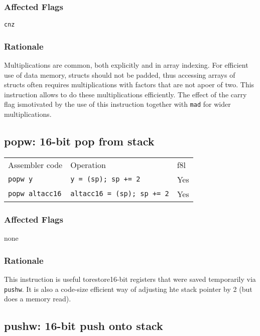 \documentclass{book}
\begin{document}
\subsubsection*{Affected Flags}

\texttt{cnz}

\subsubsection*{Rationale}

Multiplications are common, both explicitly and in array indexing. For efficient use of data memory, structs should not be padded, thus accessing arrays of structs often requires multiplications with factors that are not apoer of two. This instruction allows to do these multiplications efficiently. The effect of the carry flag ismotivated by the use of this instruction together with \texttt{mad} for wider multiplications.


\subsection{popw: 16-bit pop from stack}

\begin{tabular}{l l l}
Assembler code         & Operation                         & f8l \\
\texttt{popw y}        & \texttt{y = (sp); sp += 2}        & Yes \\
\texttt{popw altacc16} & \texttt{altacc16 = (sp); sp += 2} & Yes \\
\end{tabular}

\subsubsection*{Affected Flags}

none

\subsubsection*{Rationale}

This instruction is useful torestore16-bit registers that were saved temporarily via \texttt{pushw}. It is also a code-size efficient way of adjusting hte stack pointer by 2 (but does a memory read).


\subsection{pushw: 16-bit push onto stack}
\end{document}
